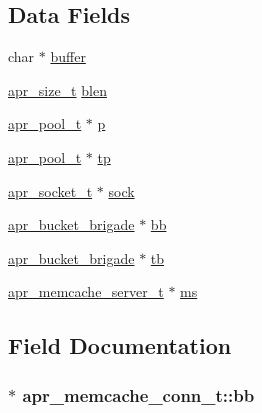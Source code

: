 \subsection*{Data Fields}
\begin{DoxyCompactItemize}
\item 
char $\ast$ \hyperlink{structapr__memcache__conn__t_a253d515b7e9d654b2dea072bea09ef8a}{buffer}
\item 
\hyperlink{group__apr__platform_gaaa72b2253f6f3032cefea5712a27540e}{apr\+\_\+size\+\_\+t} \hyperlink{structapr__memcache__conn__t_a3aa0310cb5e5c6cb8be36dfb6146ac3e}{blen}
\item 
\hyperlink{structapr__pool__t}{apr\+\_\+pool\+\_\+t} $\ast$ \hyperlink{structapr__memcache__conn__t_a9d95b65a543a959fadad874b94cd5094}{p}
\item 
\hyperlink{structapr__pool__t}{apr\+\_\+pool\+\_\+t} $\ast$ \hyperlink{structapr__memcache__conn__t_a2f7e24fb93ad04b8e42f547577e76d7c}{tp}
\item 
\hyperlink{structapr__socket__t}{apr\+\_\+socket\+\_\+t} $\ast$ \hyperlink{structapr__memcache__conn__t_acc614f90fc210c91ee96bf8399856e80}{sock}
\item 
\hyperlink{structapr__bucket__brigade}{apr\+\_\+bucket\+\_\+brigade} $\ast$ \hyperlink{structapr__memcache__conn__t_ac3af1f5d2870d8e3c367b4c7f55358fb}{bb}
\item 
\hyperlink{structapr__bucket__brigade}{apr\+\_\+bucket\+\_\+brigade} $\ast$ \hyperlink{structapr__memcache__conn__t_a59e38bb57276556217931c4abd0b79be}{tb}
\item 
\hyperlink{structapr__memcache__server__t}{apr\+\_\+memcache\+\_\+server\+\_\+t} $\ast$ \hyperlink{structapr__memcache__conn__t_ae56d40d18248763283e986a64550df38}{ms}
\end{DoxyCompactItemize}


\subsection{Field Documentation}
\subsubsection[{\texorpdfstring{bb}{bb}}]{$\ast$ apr\+\_\+memcache\+\_\+conn\+\_\+t\+::bb}\hypertarget{structapr__memcache__conn__t_ac3af1f5d2870d8e3c367b4c7f55358fb}{}\label{structapr__memcache__conn__t_ac3af1f5d2870d8e3c367b4c7f55358fb}
